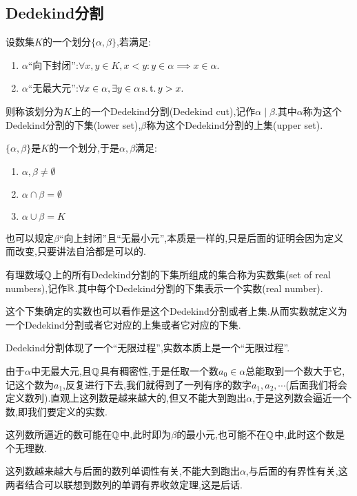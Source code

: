 \subsection{Dedekind分割}

\begin{definition}
    [Dedekind分割]
设数集$K$的一个划分$\{\alpha,\beta\}$,若满足:
    \begin{enumerate}
        \item $\alpha$“向下封闭”:$\forall x,y\in K,x<y:y\in \alpha\implies x\in \alpha.$
        \item $\alpha$“无最大元”:$\forall x\in\alpha,\exists y\in\alpha\operatorname{s.t.} y>x.$
    \end{enumerate}
    则称该划分为$K$上的一个Dedekind分割(Dedekind cut),记作$\alpha\mid\beta$.其中$\alpha$称为这个Dedekind分割的下集(lower set),$\beta$称为这个Dedekind分割的上集(upper set).
\end{definition}

\begin{remark}
    $\{\alpha,\beta\}$是$K$的一个划分,于是$\alpha,\beta$满足:
    \begin{enumerate}
        \item $\alpha,\beta\ne\emptyset$
        \item $\alpha\cap\beta =\emptyset$
        \item $\alpha\cup\beta =K$
    \end{enumerate}
\end{remark}

\begin{remark}
    也可以规定$\beta$“向上封闭”且“无最小元”,本质是一样的,只是后面的证明会因为定义而改变,只要讲法自洽都是可以的.
\end{remark}

\begin{definition}
    [实数集]
    有理数域$\mathbb{Q}$上的所有Dedekind分割的下集所组成的集合称为实数集(set of real numbers),记作$\mathbb{R}$.其中每个Dedekind分割的下集表示一个实数(real number).
\end{definition}

\begin{remark}
    这个下集确定的实数也可以看作是这个Dedekind分割或者上集.从而实数就定义为一个Dedekind分割或者它对应的上集或者它对应的下集.
\end{remark}

\begin{note}
    Dedekind分割体现了一个“无限过程”,实数本质上是一个“无限过程”.
    
    由于$\alpha$中无最大元,且$\mathbb{Q}$具有稠密性,于是任取一个数$a_0\in\alpha$总能取到一个数大于它,记这个数为$a_1$,反复进行下去,我们就得到了一列有序的数字$a_1,a_2,\cdots$(后面我们将会定义数列).直观上这列数是越来越大的,但又不能大到跑出$\alpha$,于是这列数会逼近一个数,即我们要定义的实数.
\end{note}

\begin{remark}
    这列数所逼近的数可能在$\mathbb{Q}$中,此时即为$\beta$的最小元,也可能不在$\mathbb{Q}$中,此时这个数是个无理数.
\end{remark}

\begin{remark}
    这列数越来越大与后面的数列单调性有关,不能大到跑出$\alpha$,与后面的有界性有关,这两者结合可以联想到数列的单调有界收敛定理,这是后话.
\end{remark}
